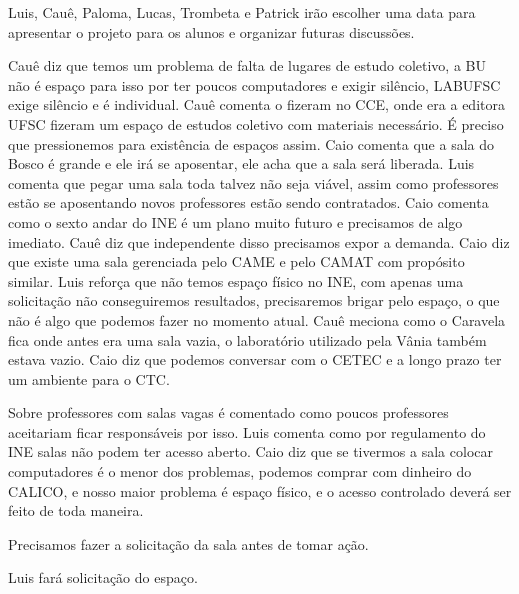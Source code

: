 \documentclass{ata-calico}
\begin{document}
Luis, Cauê, Paloma, Lucas, Trombeta e Patrick irão escolher uma data para apresentar o projeto para os alunos e organizar futuras discussões.

Cauê diz que temos um problema de falta de lugares de estudo coletivo, a BU não é espaço para isso por ter poucos computadores e exigir silêncio, LABUFSC exige silêncio e é individual. Cauê comenta o fizeram no CCE, onde era a editora UFSC fizeram um espaço de estudos coletivo com materiais necessário. É preciso que pressionemos para existência de espaços assim. Caio comenta que a sala do Bosco é grande e ele irá se aposentar, ele acha que a sala será liberada. Luis comenta que pegar uma sala toda talvez não seja viável, assim como professores estão se aposentando novos professores estão sendo contratados. Caio comenta como o sexto andar do INE é um plano muito futuro e precisamos de algo imediato. Cauê diz que independente disso precisamos expor a demanda. Caio diz que existe uma sala gerenciada pelo CAME e pelo CAMAT com propósito similar. Luis reforça que não temos espaço físico no INE, com apenas uma solicitação não conseguiremos resultados, precisaremos brigar pelo espaço, o que não é algo que podemos fazer no momento atual. Cauê meciona como o Caravela fica onde antes era uma sala vazia, o laboratório utilizado pela Vânia também estava vazio. Caio diz que podemos conversar com o CETEC e a longo prazo ter um ambiente para o CTC. 

Sobre professores com salas vagas é comentado como poucos professores aceitariam ficar responsáveis por isso. Luis comenta como por regulamento do INE salas não podem ter acesso aberto. Caio diz que se tivermos a sala colocar computadores é o menor dos problemas, podemos comprar com dinheiro do CALICO, e nosso maior problema é espaço físico, e o acesso controlado deverá ser feito de toda maneira.

Precisamos fazer a solicitação da sala antes de tomar ação.

Luis fará solicitação do espaço.

\end{document}
